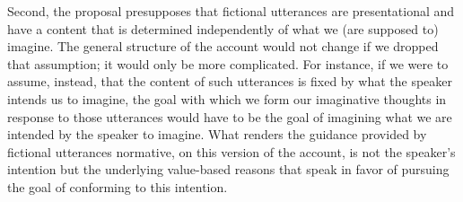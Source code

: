 Second, the proposal presupposes that fictional utterances are presentational and have a content that is determined independently of what we (are supposed to) imagine. The general structure of the account would not change if we dropped that assumption; it would only be more complicated. For instance, if we were to assume, instead, that the content of such utterances is fixed by what the speaker intends us to imagine, the goal with which we form our imaginative thoughts in response to those utterances would have to be the goal of imagining what we are intended by the speaker to imagine. What renders the guidance provided by fictional utterances normative, on this version of the account, is not the speaker's intention but the underlying value-based reasons that speak in favor of pursuing the goal of conforming to this intention.


